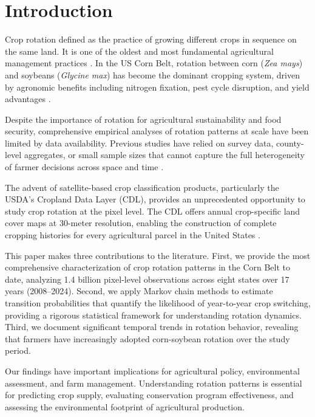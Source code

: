 \documentclass[12pt, a4paper]{article}
\begin{document}
\section{Introduction}

Crop rotation defined as the practice of growing different crops in sequence on the same land. It is one of the oldest and most fundamental agricultural management practices \citep{bullock1992crop}. In the US Corn Belt, rotation between corn (\textit{Zea mays}) and soybeans (\textit{Glycine max}) has become the dominant cropping system, driven by agronomic benefits including nitrogen fixation, pest cycle disruption, and yield advantages \citep{porter1997environmental, seifert2017yield}.

Despite the importance of rotation for agricultural sustainability and food security, comprehensive empirical analyses of rotation patterns at scale have been limited by data availability. Previous studies have relied on survey data, county-level aggregates, or small sample sizes that cannot capture the full heterogeneity of farmer decisions across space and time \citep{claassen2011grassland, lark2015cropland}.

The advent of satellite-based crop classification products, particularly the USDA's Cropland Data Layer (CDL), provides an unprecedented opportunity to study crop rotation at the pixel level. The CDL offers annual crop-specific land cover maps at 30-meter resolution, enabling the construction of complete cropping histories for every agricultural parcel in the United States \citep{boryan2011monitoring}.

This paper makes three contributions to the literature. First, we provide the most comprehensive characterization of crop rotation patterns in the Corn Belt to date, analyzing 1.4 billion pixel-level observations across eight states over 17 years (2008--2024). Second, we apply Markov chain methods to estimate transition probabilities that quantify the likelihood of year-to-year crop switching, providing a rigorous statistical framework for understanding rotation dynamics. Third, we document significant temporal trends in rotation behavior, revealing that farmers have increasingly adopted corn-soybean rotation over the study period.

Our findings have important implications for agricultural policy, environmental assessment, and farm management. Understanding rotation patterns is essential for predicting crop supply, evaluating conservation program effectiveness, and assessing the environmental footprint of agricultural production.
\end{document}
